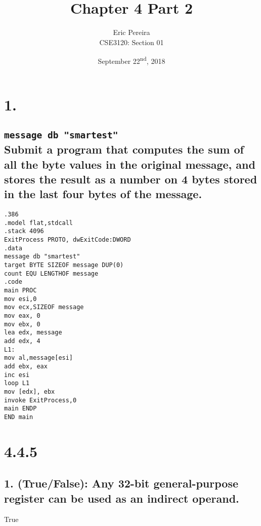 \documentclass[12pt]{article}
\begin{document}
\author{Eric Pereira\\
	CSE3120: Section 01}
\date{September 22\textsuperscript{nd}, 2018}
\title{Chapter 4 Part 2}
\maketitle
\section*{1.} 
\subsection*{\texttt{message db "smartest"} \\Submit a program that computes the sum of all the byte values in the original message, and stores the result as a number on 4 bytes stored in the last four bytes of the message.}
\texttt{.386 \\
	.model flat,stdcall \\
	.stack 4096 \\
	ExitProcess PROTO, dwExitCode:DWORD \\
	.data \\
	message db "smartest" \\
	target BYTE SIZEOF message DUP(0) \\
	count EQU LENGTHOF message \\
	.code \\
	main PROC \\
	mov esi,0 \\
	mov ecx,SIZEOF message \\
	mov eax, 0 \\
	mov ebx, 0 \\
	lea edx, message \\
	add edx, 4 \\
	L1: \\
	mov al,message[esi] \\
	add ebx, eax \\
	inc esi \\
	loop L1 \\
	mov [edx], ebx \\
	invoke ExitProcess,0 \\
	main ENDP \\
	END main} 
\section*{4.4.5}
\subsection*{1. (True/False): Any 32-bit general-purpose register can be used as an indirect operand.}
True
\end{document}
